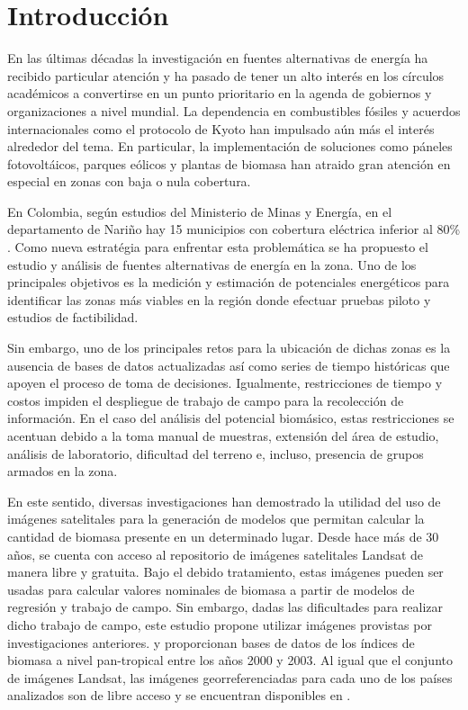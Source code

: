 \section{Introducción}


En las últimas décadas la investigación en fuentes alternativas de energía ha recibido particular atención y ha pasado de tener un alto interés en los círculos académicos a convertirse en un punto prioritario en la agenda de gobiernos y organizaciones a nivel mundial.  La dependencia en combustibles fósiles y acuerdos internacionales como el protocolo de Kyoto han impulsado aún más el interés alrededor del tema.  En particular, la implementación de soluciones como páneles fotovoltáicos, parques eólicos y plantas de biomasa han atraido gran atención en especial en zonas con baja o nula cobertura.

En Colombia, según estudios del Ministerio de Minas y Energía, en el departamento de Nariño hay 15 municipios con cobertura eléctrica inferior al 80\% \cite{ministerio_de_minas_y_energia_plan_2008}. Como nueva estratégia para enfrentar esta problemática se ha propuesto el estudio y análisis de fuentes alternativas de energía en la zona. Uno de los principales objetivos es la medición y estimación de potenciales energéticos para identificar las zonas más viables en la región donde efectuar pruebas piloto y estudios de factibilidad. 

Sin embargo, uno de los principales retos para la ubicación de dichas zonas es la ausencia de bases de datos actualizadas así como series de tiempo históricas que apoyen el proceso de toma de decisiones.  Igualmente, restricciones de tiempo y costos impiden el despliegue de trabajo de campo para la recolección de información.  En el caso del análisis del potencial biomásico, estas restricciones se acentuan debido a la toma manual de muestras, extensión del área de estudio, análisis de laboratorio, dificultad del terreno e, incluso, presencia de grupos armados en la zona. 

En este sentido, diversas investigaciones han demostrado la utilidad del uso de imágenes satelitales para la generación de modelos que permitan calcular la cantidad de biomasa presente en un determinado lugar. Desde hace más de 30 años, se cuenta con acceso al repositorio de imágenes satelitales Landsat \cite{landsat} de manera libre y gratuita.  Bajo el debido tratamiento, estas imágenes pueden ser usadas para calcular valores nominales de biomasa a partir de modelos de regresión y trabajo de campo.  Sin embargo, dadas las dificultades para realizar dicho trabajo de campo, este estudio propone utilizar imágenes provistas por investigaciones anteriores.   \cite{baccini2008afirst} y \cite{baccini_estimated_2012} proporcionan bases de datos de los índices de biomasa a nivel pan-tropical entre los años 2000 y 2003.  Al igual que el conjunto de imágenes Landsat, las imágenes georreferenciadas para cada uno de los países analizados son de libre acceso y se encuentran disponibles en \cite{WHRC}.

